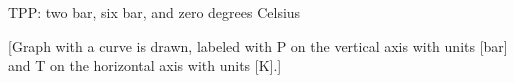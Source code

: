 TPP: two bar, six bar, and zero degrees Celsius

[Graph with a curve is drawn, labeled with P on the vertical axis with units [bar] and T on the horizontal axis with units [K].]